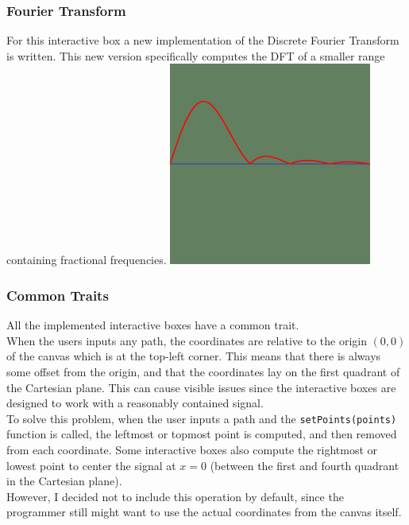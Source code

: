\documentclass{article}
\begin{document}
\pagebreak

\subsubsection{Fourier Transform}

\begin{multicols}{2}
    For this interactive box a new implementation of the Discrete Fourier Transform
    is written. This new version specifically computes the DFT of a smaller range containing fractional frequencies.
    \includegraphics[width=0.5\textwidth]{fouriertransformabs.png}
\end{multicols}

\subsubsection{Common Traits}

All the implemented interactive boxes have a common trait. \\
When the users inputs any path, the coordinates are relative to the origin \((0,0)\)
of the canvas which is at the top-left corner. This means that there is always some
offset from the origin, and that the coordinates
lay on the first quadrant of the Cartesian plane.
This can cause visible issues since the interactive boxes are designed to work with a reasonably contained signal.
\\
To solve this problem, when the user inputs a path and the \texttt{setPoints(points)} function is called,
the leftmost or topmost point is computed, and then removed from each coordinate.
Some interactive boxes also compute the rightmost or lowest point to center the signal at \(x=0\)
(between the first and fourth quadrant in the Cartesian plane).
\\
However, I decided not to include this operation by default, since the programmer still
might want to use the actual coordinates from the canvas itself.
\end{document}
